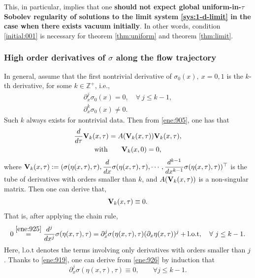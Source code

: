 \documentclass[11pt]{article}
\theoremstyle{plain}
\theoremstyle{definition}
\theoremstyle{remark}
\newcommand{\mrm}[1]{\mathrm{#1}}
\newcommand{\dx}{\partial_x}
\renewcommand{\vec}[1]{{\bf #1}}
\numberwithin{equation}{section}
\begin{document}
This, in particular, implies that one {\bf should not expect global uniform-in-$\tau$ Sobolev regularity of solutions to the limit system \eqref{sys:1-d-limit} in the case when there exists vacuum initially}. In other words, condition \eqref{initial:001} is necessary for theorem \ref{thm:uniform} and theorem \ref{thm:limit}. 


\subsubsection*{High order derivatives of $ \sigma $ along the flow trajectory}

In general, assume that the first nontrivial derivative of $ \sigma_0(x), \ x = 0,1 $ is the $ k$-th derivative, for some $ k \in \mathbb Z^+ $, i.e., 
\begin{equation}
    \label{ene:923}
    \begin{gathered}
    \partial_{x}^j \sigma_0(x) = 0, \quad \forall \ j \leq k - 1, \\
    \partial_x^k \sigma_0(x) \neq 0.
    \end{gathered}
\end{equation}
Such $ k $ always exists for nontrivial data. 
Then from \eqref{ene:905}, one has that
\begin{equation}
    \label{ene:924}
    \begin{gathered}
    \dfrac{d}{d\tau} \vec V_k(x,\tau ) = A(\vec V_k(x,\tau))\vec V_k(x,\tau), \\
    \text{with} \qquad \vec V_k(x,0) = 0,
\end{gathered}
\end{equation}
where $ \vec  V_k(x,\tau) := (\sigma(\eta(x,\tau),\tau), \dfrac{d}{dx}\sigma(\eta(x,\tau),\tau), \cdots, \dfrac{d^{k-1}}{dx^{k-1}}\sigma(\eta(x,\tau),\tau))^\top $ is the tube of derivatives with orders smaller than $ k $, and $ A(\vec V_k(x,\tau)) $ is a non-singular matrix. Then one can derive that, 
\begin{equation}
    \label{ene:925}
    \vec V_k(x,\tau) \equiv 0.
\end{equation}
That is, after applying the chain rule,
\begin{equation}
    \label{ene:926}
    0 \stackrel{\eqref{ene:925}}{=} \dfrac{d^j}{dx^j} \sigma(\eta(x,\tau),\tau) = \partial_x^j \sigma(\eta(x,\tau),\tau) (\dx \eta(x,\tau))^j + \mrm{l.o.t}, \quad \forall \ j \leq k - 1.
\end{equation}
Here, $ \mrm{l.o.t} $ denotes the terms involving only derivatives with orders smaller than $ j $. 
Thanks to \eqref{ene:919}, one can derive from \eqref{ene:926} by induction that
\begin{equation}
    \label{ene:926-1}
    \dx^j \sigma (\eta(x,\tau),\tau) \equiv 0, \qquad \forall j \leq k-1.
\end{equation}
\end{document}

